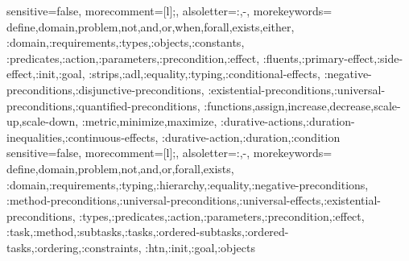 

\usepackage{etoolbox}
\AtEndPreamble{\usepackage{scrhack}}


\usepackage{longtable}


\usepackage{latexdemo}


\ifdeutsch
  \setlength{\emergencystretch}{3em} %
\fi


\theoremstyle{break}
\theorembodyfont{\upshape}
\newtheorem{Tdef}{Definition}[section]

{
  sensitive=false,    %
  morecomment=[l]{;}, %
  alsoletter={:,-},   %
  morekeywords={
    define,domain,problem,not,and,or,when,forall,exists,either,
    :domain,:requirements,:types,:objects,:constants,
    :predicates,:action,:parameters,:precondition,:effect,
    :fluents,:primary-effect,:side-effect,:init,:goal,
    :strips,:adl,:equality,:typing,:conditional-effects,
    :negative-preconditions,:disjunctive-preconditions,
    :existential-preconditions,:universal-preconditions,:quantified-preconditions,
    :functions,assign,increase,decrease,scale-up,scale-down,
    :metric,minimize,maximize,
    :durative-actions,:duration-inequalities,:continuous-effects,
    :durative-action,:duration,:condition
  }
}
{
  sensitive=false,    %
  morecomment=[l]{;}, %
  alsoletter={:,-},   %
  morekeywords={
    define,domain,problem,not,and,or,forall,exists,
    :domain,:requirements,:typing,:hierarchy,:equality,:negative-preconditions,
    :method-preconditions,:universal-preconditions,:universal-effects,:existential-preconditions,
    :types,:predicates,:action,:parameters,:precondition,:effect,
    :task,:method,:subtasks,:tasks,:ordered-subtasks,:ordered-tasks,:ordering,:constraints,
    :htn,:init,:goal,:objects
  }
}

